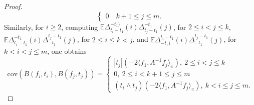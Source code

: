 \documentclass[10pt,a4paper]{amsart}
\begin{document}
\begin{proof}
\begin{equation}
\begin{cases}
 0\quad k+1\le j\le m.
   \end{cases}
  \end{equation}
Similarly, for $i\ge 2$, computing
 $\mathbb{E}\Delta^{-t_1)}_{t_i-t_1}(i)\Delta^{-t_1}_{t_j-t_1}(j)$, 
 for $2\le i<j\le k$,
 $\mathbb{E}\Delta^{-t_1}_{t_i-t_1}(i)\Delta^{t_j-t_1}_{-t_1}(j)$, 
 for $2\le i\le k<j$, and
 $\mathbb{E}\Delta^{t_i-t_1}_{-t_1)}(i)\Delta^{t_j-t_1}_{-t_1}(j)$, 
 for $k<i<j\le m$,
 one obtains
\begin{equation}\label{covform2}
  \text{cov}(B(f_i,t_i),B(f_j,t_j))
  =
 \begin{cases}|t_j|
  (-2\langle f_1, A^{-1}f_j\rangle_\pi),\  2\le i<j\le k\\
0,\  2\le i <k+1\le j\le m\\
 (t_i\wedge t_j)
  (-2\langle f_1, A^{-1}f_j\rangle_\pi),\ k < i\le j\le m.
  \end{cases}
    \end{equation}
 \end{proof}
\end{document}
